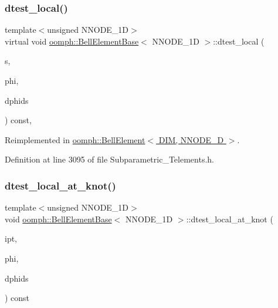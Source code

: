 \mbox{\label{classoomph_1_1BellElementBase_aab180be9cd6347005c5505bedf673db2}} 
\subsubsection{\texorpdfstring{dtest\+\_\+local()}{dtest\_local()}}
{\footnotesize\ttfamily template$<$unsigned N\+N\+O\+D\+E\+\_\+1D$>$ \\
virtual void \hyperlink{classoomph_1_1BellElementBase}{oomph\+::\+Bell\+Element\+Base}$<$ N\+N\+O\+D\+E\+\_\+1D $>$\+::dtest\+\_\+local (\begin{DoxyParamCaption}\item[{const \hyperlink{classoomph_1_1Vector}{Vector}$<$ double $>$ \&}]{s,  }\item[{\hyperlink{classoomph_1_1Shape}{Shape} \&}]{phi,  }\item[{\hyperlink{classoomph_1_1DShape}{D\+Shape} \&}]{dphids }\end{DoxyParamCaption}) const\hspace{0.3cm}{\ttfamily [inline]}, {\ttfamily [virtual]}}



Reimplemented in \hyperlink{classoomph_1_1BellElement_ae0b6d4d44df8a05a9dd1b8709c9f0247}{oomph\+::\+Bell\+Element$<$ D\+I\+M, N\+N\+O\+D\+E\+\_\+D $>$}.



Definition at line 3095 of file Subparametric\+\_\+\+Telements.\+h.

\mbox{\label{classoomph_1_1BellElementBase_a5ca86e4bbc0c1c0df2554e02669a0949}} 
\subsubsection{\texorpdfstring{dtest\+\_\+local\+\_\+at\+\_\+knot()}{dtest\_local\_at\_knot()}}
{\footnotesize\ttfamily template$<$unsigned N\+N\+O\+D\+E\+\_\+1D$>$ \\
void \hyperlink{classoomph_1_1BellElementBase}{oomph\+::\+Bell\+Element\+Base}$<$ N\+N\+O\+D\+E\+\_\+1D $>$\+::dtest\+\_\+local\+\_\+at\+\_\+knot (\begin{DoxyParamCaption}\item[{const unsigned \&}]{ipt,  }\item[{\hyperlink{classoomph_1_1Shape}{Shape} \&}]{phi,  }\item[{\hyperlink{classoomph_1_1DShape}{D\+Shape} \&}]{dphids }\end{DoxyParamCaption}) const\hspace{0.3cm}{\ttfamily [inline]}}



